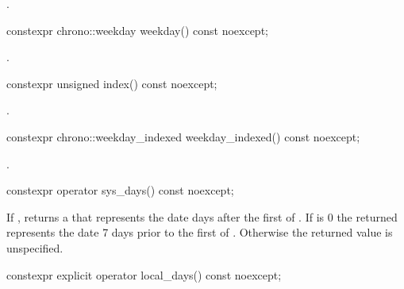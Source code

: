 \begin{itemdescr}
\pnum
\returns
{}.
\end{itemdescr}

%
\begin{itemdecl}
constexpr chrono::weekday weekday() const noexcept;
\end{itemdecl}

\begin{itemdescr}
\pnum
\returns
{}.
\end{itemdescr}

%
\begin{itemdecl}
constexpr unsigned index() const noexcept;
\end{itemdecl}

\begin{itemdescr}
\pnum
\returns
{}.
\end{itemdescr}

%
\begin{itemdecl}
constexpr chrono::weekday_indexed weekday_indexed() const noexcept;
\end{itemdecl}

\begin{itemdescr}
\pnum
\returns
{}.
\end{itemdescr}

%
\begin{itemdecl}
constexpr operator sys_days() const noexcept;
\end{itemdecl}

\begin{itemdescr}
\pnum
\returns
If ,
returns a  that
represents the date  days after
the first  of .
If  is 0
the returned 
represents the date 7 days prior to
the first  of .
Otherwise the returned value is unspecified.
\end{itemdescr}

%
\begin{itemdecl}
constexpr explicit operator local_days() const noexcept;
\end{itemdecl}

